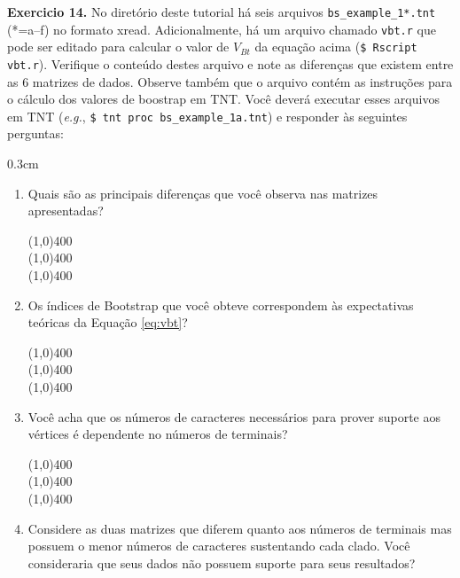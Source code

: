 \begin{refsection}
\begin{blackBlock}{\textbf{Exercicio 14.}}
No diretório deste tutorial há seis arquivos \texttt{bs\_example\_1*.tnt} (*=a--f) no formato xread. Adicionalmente, há um arquivo chamado \texttt{vbt.r} que pode ser editado para calcular o valor de $V_{Bt}$ da equação acima (\texttt{\$ Rscript vbt.r}). Verifique o conteúdo destes arquivo e note as diferenças que existem entre as 6 matrizes de dados. Observe também que o arquivo contém as instruções para o cálculo dos valores de boostrap em TNT. Você deverá executar esses arquivos em TNT (\textit{e.g.}, \texttt{\$ tnt proc bs\_example\_1a.tnt}) e responder às seguintes perguntas:

\end{blackBlock}


\begin {myindentpar}{0.3cm}
\begin{enumerate}[\itshape 1.]

	\item{Quais são as principais diferenças que você observa nas matrizes apresentadas?}


\begin{center}
\line(1,0){400}\\
\line(1,0){400}\\
\line(1,0){400}\\
\end{center}


	\item{Os índices de Bootstrap que você obteve correspondem às expectativas teóricas da Equação \ref{eq:vbt}?}

\begin{center}
\line(1,0){400}\\
\line(1,0){400}\\
\line(1,0){400}\\
\end{center}

	\item{Você acha que os números de caracteres necessários para prover suporte aos vértices é dependente no números de terminais?}


\begin{center}
\line(1,0){400}\\
\line(1,0){400}\\
\line(1,0){400}\\
\end{center}


	\item{Considere as duas matrizes que diferem quanto aos números de terminais mas possuem o menor números de caracteres sustentando cada clado. Você consideraria que seus dados não possuem suporte para seus resultados?}



\end{enumerate}
\end{myindentpar}
\end{refsection}
